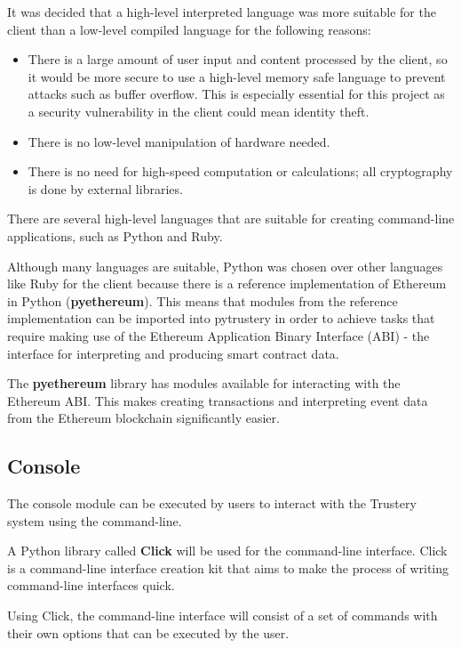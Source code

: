 \documentclass[12pt,a4paper]{report}
\begin{document}
	It was decided that a high-level interpreted language was more suitable for the client than a low-level compiled language for the following reasons:
	\begin{itemize}
		\item There is a large amount of user input and content processed by the client, so it would be more secure to use a high-level memory safe language to prevent attacks such as buffer overflow. This is especially essential for this project as a security vulnerability in the client could mean identity theft.
		\item There is no low-level manipulation of hardware needed.
		\item There is no need for high-speed computation or calculations; all cryptography is done by external libraries.
	\end{itemize}
	
	There are several high-level languages that are suitable for creating command-line applications, such as Python and Ruby.
	
	Although many languages are suitable, Python was chosen over other languages like Ruby for the client because there is a reference implementation of Ethereum in Python (\textbf{pyethereum}).\cite{16} This means that modules from the reference implementation can be imported into pytrustery in order to achieve tasks that require making use of the Ethereum Application Binary Interface (ABI)\cite{14} - the interface for interpreting and producing smart contract data.
	
	The \textbf{pyethereum} library has modules available for interacting with the Ethereum ABI. This makes creating transactions and interpreting event data from the Ethereum blockchain significantly easier.
	
	\subsection{Console}
	The console module can be executed by users to interact with the Trustery system using the command-line.
	
	A Python library called \textbf{Click} will be used for the command-line interface. Click is a command-line interface creation kit that aims to make the process of writing command-line interfaces quick.\cite{17}
	
	Using Click, the command-line interface will consist of a set of commands with their own options that can be executed by the user.
	
\end{document}
